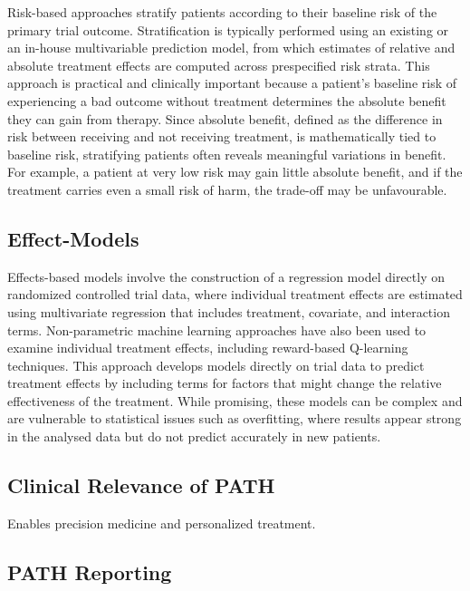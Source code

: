 \documentclass{article}
\begin{document}
Risk-based approaches stratify patients according to their baseline risk
of the primary trial outcome. Stratification is typically performed
using an existing or an in-house multivariable prediction model, from
which estimates of relative and absolute treatment effects are computed
across prespecified risk strata. This approach is practical and
clinically important because a patient's baseline risk of experiencing a
bad outcome without treatment determines the absolute benefit they can
gain from therapy. Since absolute benefit, defined as the difference in
risk between receiving and not receiving treatment, is mathematically
tied to baseline risk, stratifying patients often reveals meaningful
variations in benefit. For example, a patient at very low risk may gain
little absolute benefit, and if the treatment carries even a small risk
of harm, the trade-off may be unfavourable.

\subsection{Effect-Models}\label{effect-models}

Effects-based models involve the construction of a regression model
directly on randomized controlled trial data, where individual treatment
effects are estimated using multivariate regression that includes
treatment, covariate, and interaction terms. Non-parametric machine
learning approaches have also been used to examine individual treatment
effects, including reward-based Q-learning techniques. This approach
develops models directly on trial data to predict treatment effects by
including terms for factors that might change the relative effectiveness
of the treatment. While promising, these models can be complex and are
vulnerable to statistical issues such as overfitting, where results
appear strong in the analysed data but do not predict accurately in new
patients.

\subsection{Clinical Relevance of
PATH}\label{clinical-relevance-of-path}

Enables precision medicine and personalized treatment.

\subsection{PATH Reporting}\label{path-reporting}
\end{document}
